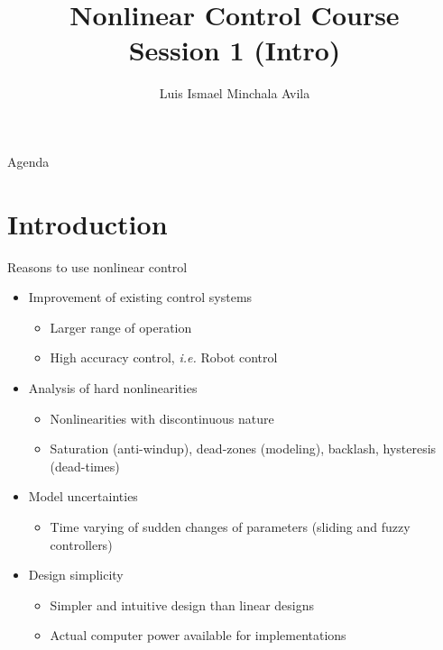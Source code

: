 \documentclass{beamer}
\title[Universidad de Cuenca]					%
{\textbf{Nonlinear Control Course} \\ Session 1 (Intro)}
\author[Ismael Minchala A.]					%
{Luis Ismael Minchala Avila } %
\institute[]	 							%
{
  Universidad de Cuenca \\ Departamento de Eléctrica, Electrónica y Telecomunicaciones \\
  {\tt ismael.minchala@ucuenca.edu.ec}					%

}
\date[January 2016]						%
{}
\begin{document}

\begin{frame}
  \titlepage								%
\end{frame}

\begin{frame}{Agenda}
  \tableofcontents 							%
\end{frame}

\section{Introduction}
\begin{frame}{Reasons to use nonlinear control}
\begin{itemize}
	\item Improvement of existing control systems
		\begin{itemize}
			\item Larger range of operation
			\item High accuracy control, \emph{i.e.} Robot control
		\end{itemize}
	\item Analysis of hard nonlinearities
		\begin{itemize}
			\item Nonlinearities with discontinuous nature
			\item Saturation (anti-windup), dead-zones (modeling), backlash, hysteresis (dead-times)
		\end{itemize}
	\item Model uncertainties
		\begin{itemize}
			\item Time varying of sudden changes of parameters (sliding and fuzzy controllers)
		\end{itemize}
	\item Design simplicity
		\begin{itemize}
			\item Simpler and intuitive design than linear designs
			\item Actual computer power available for implementations
		\end{itemize}
\end{itemize}
\end{frame}
\end{document}
